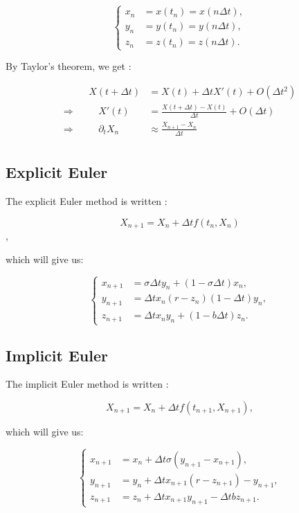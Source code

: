 \documentclass[12pt]{article}
\begin{document}
	$$\left\{\begin{aligned} 
		x_n&=x(t_n)=x(n\Delta t), \\
		y_n&=y(t_n)=y(n\Delta t), \\
		z_n&=z(t_n)=z(n\Delta t).
	\end{aligned}\right.$$
	
	\noindent By Taylor's theorem, we get :
	
	$$\begin{aligned}
		&&X(t+\Delta t)&=X(t)+\Delta t X'(t) + O(\Delta t^2) \\
		\Rightarrow&& \quad X'(t)&=\frac{X(t+\Delta t)-X(t)}{\Delta t} + O(\Delta t) \\
		\Rightarrow&& \quad \partial_t X_n&\approx\frac{X_{n+1}-X_n}{\Delta t} \\
	\end{aligned}
	$$	
	
	\subsection{Explicit Euler}
	
	The explicit Euler method is written :
	
	$$X_{n+1}=X_n+\Delta t f(t_n,X_n)$$,
	
	\noindent which will give us:
	
	$$\left\{\begin{aligned} 
		x_{n+1}&=\sigma\Delta t y_n+(1-\sigma\Delta t) x_n ,\\
		y_{n+1}&=\Delta t x_n(r-z_n)(1-\Delta t)y_n ,\\
		z_{n+1}&=\Delta t x_ny_n+(1-b\Delta t)z_n.
	\end{aligned}\right.$$
	
	\subsection{Implicit Euler}
	
	The implicit Euler method is written :
	
	$$X_{n+1}=X_n+\Delta t f(t_{n+1},X_{n+1}),$$
	
	\noindent which will give us:
	
	$$\left\{\begin{aligned} 
		x_{n+1}&=x_n+\Delta t\sigma(y_{n+1}-x_{n+1}), \\
		y_{n+1}&=y_n+\Delta t x_{n+1}(r-z_{n+1})-y_{n+1}, \\
		z_{n+1}&=z_n+\Delta tx_{n+1}y_{n+1}-\Delta tbz_{n+1}.
	\end{aligned}\right.$$
	
\end{document}
